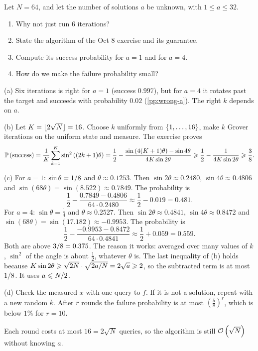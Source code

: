 \begin{exercisebox}
\begin{pproblem}\label{pp:unknown-a}
    Let $N = 64$, and let the number of solutions $a$ be unknown, with $1 \leq a \leq 32$.
    \begin{enumerate}[label=(\alph*)]
        \item Why not just run $6$ iterations?
        \item State the algorithm of the Oct 8 exercise and its guarantee.
        \item Compute its success probability for $a = 1$ and for $a = 4$.
        \item How do we make the failure probability small?
    \end{enumerate}
\end{pproblem}
\tcblower
\begin{wsolution}
    (a) Six iterations is right for $a = 1$ (success $0.997$), but for $a = 4$ it rotates past the
    target and succeeds with probability $0.02$ (\cref{pp:wrong-a}). The right $k$ depends on $a$.

    (b) Let $K = \floor{2\sqrt{N}} = 16$. Choose $k$ uniformly from $\left\lbrace1, \dots, 16\right\rbrace$, make $k$
    Grover iterations on the uniform state and measure. The exercise proves
    \[\operatorname{\mathbb{P}}\left(\text{success}\right)
        = \frac{1}{K} \sum_{k=1}^{K} \sin^2\left((2k+1)\theta\right)
        = \frac{1}{2} - \frac{\sin\left(4(K+1)\theta\right) - \sin 4\theta}{4K \sin 2\theta}
        \geqslant \frac{1}{2} - \frac{1}{4K \sin 2\theta}
        \geqslant \frac{3}{8}.\]

    (c) For $a = 1$: $\sin\theta = 1/8$ and $\theta \approx 0.1253$. Then
    $\sin 2\theta \approx 0.2480$, $\sin 4\theta \approx 0.4806$ and
    $\sin(68\theta) = \sin(8.522) \approx 0.7849$. The probability is
    \[\frac{1}{2} - \frac{0.7849 - 0.4806}{64 \cdot 0.2480} \approx \frac{1}{2} - 0.019 = 0.481.\]
    For $a = 4$: $\sin\theta = \frac{1}{4}$ and $\theta \approx 0.2527$. Then
    $\sin 2\theta \approx 0.4841$, $\sin 4\theta \approx 0.8472$ and
    $\sin(68\theta) = \sin(17.182) \approx -0.9953$. The probability is
    \[\frac{1}{2} - \frac{-0.9953 - 0.8472}{64 \cdot 0.4841} \approx \frac{1}{2} + 0.059 = 0.559.\]
    Both are above $3/8 = 0.375$. The reason it works: averaged over many values of $k$,
    $\sin^2$ of the angle is about $\frac{1}{2}$, whatever $\theta$ is. The last inequality of (b)
    holds because
    $K \sin 2\theta \geqslant \sqrt{2N} \cdot \sqrt{2a/N} = 2\sqrt{a} \geqslant 2$, so the subtracted
    term is at most $1/8$. It uses $a \leqslant N/2$.

    (d) Check the measured $x$ with one query to $f$. If it is not a solution, repeat with a new
    random $k$. After $r$ rounds the failure probability is at most
    $\left(\frac{5}{8}\right)^r$, which is below $1\%$ for $r = 10$.

    Each round costs at most $16 = 2\sqrt{N}$ queries, so the algorithm is still
    $\mathcal{O}\left(\sqrt{N}\right)$ without knowing $a$.
\end{wsolution}
\end{exercisebox}
